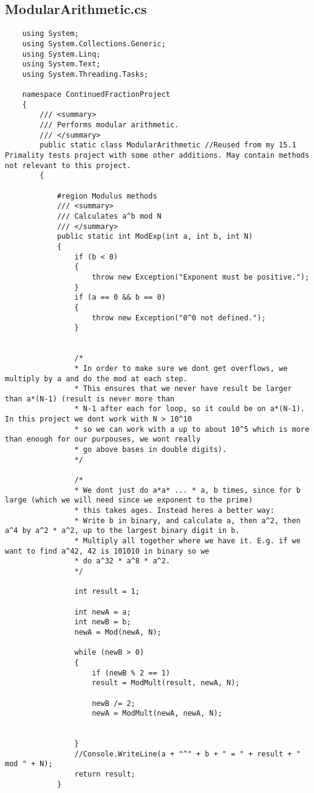 \documentclass{article}
\begin{document}
\subsection{ModularArithmetic.cs}

\begin{lstlisting}
	using System;
	using System.Collections.Generic;
	using System.Linq;
	using System.Text;
	using System.Threading.Tasks;
	
	namespace ContinuedFractionProject
	{
		/// <summary>
		/// Performs modular arithmetic.
		/// </summary>
		public static class ModularArithmetic //Reused from my 15.1 Primality tests project with some other additions. May contain methods not relevant to this project.
		{
			
			#region Modulus methods
			/// <summary>
			/// Calculates a^b mod N
			/// </summary>
			public static int ModExp(int a, int b, int N)
			{
				if (b < 0)
				{
					throw new Exception("Exponent must be positive.");
				}
				if (a == 0 && b == 0)
				{
					throw new Exception("0^0 not defined.");
				}
				
				
				/*
				* In order to make sure we dont get overflows, we multiply by a and do the mod at each step.
				* This ensures that we never have result be larger than a*(N-1) (result is never more than
				* N-1 after each for loop, so it could be on a*(N-1). In this project we dont work with N > 10^10
				* so we can work with a up to about 10^5 which is more than enough for our purpouses, we wont really
				* go above bases in double digits).
				*/
				
				/*
				* We dont just do a*a* ... * a, b times, since for b large (which we will need since we exponent to the prime)
				* this takes ages. Instead heres a better way:
				* Write b in binary, and calculate a, then a^2, then a^4 by a^2 * a^2, up to the largest binary digit in b.
				* Multiply all together where we have it. E.g. if we want to find a^42, 42 is 101010 in binary so we
				* do a^32 * a^8 * a^2.
				*/
				
				int result = 1;
				
				int newA = a;
				int newB = b;
				newA = Mod(newA, N);
				
				while (newB > 0)
				{
					if (newB % 2 == 1)
					result = ModMult(result, newA, N);
					
					newB /= 2;
					newA = ModMult(newA, newA, N);
					
					
				}
				//Console.WriteLine(a + "^" + b + " = " + result + " mod " + N);
				return result;
			}
			

\end{lstlisting}
\end{document}
